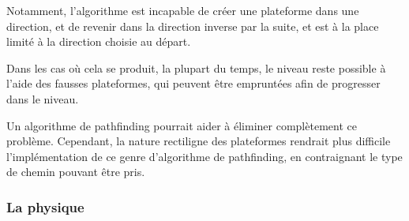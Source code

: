 \documentclass[10pt]{report}
\begin{document}
Notamment, l'algorithme est incapable de créer une plateforme dans une direction, et de revenir dans
la direction inverse par la suite, et est à la place limité à la direction choisie au départ.

Dans les cas où cela se produit, la plupart du temps, le niveau reste possible à l'aide des fausses plateformes,
qui peuvent être empruntées afin de progresser dans le niveau.

Un algorithme de pathfinding pourrait aider à éliminer complètement ce problème.
Cependant, la nature rectiligne des plateformes rendrait plus difficile l'implémentation de ce genre d'algorithme
de pathfinding, en contraignant le type de chemin pouvant être pris.

\subsubsection{La physique} %

\tableofcontents
\end{document}
